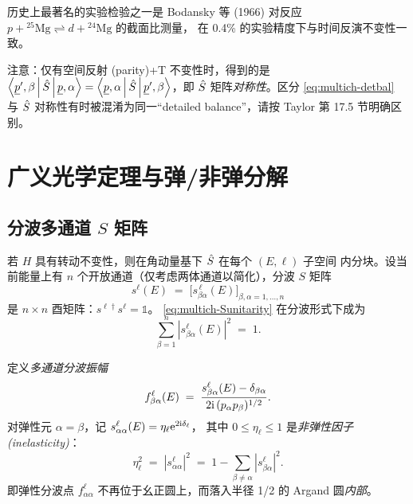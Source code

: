 历史上最著名的实验检验之一是 Bodansky 等 (1966) 对反应
$p+{}^{25}\text{Mg}\rightleftharpoons d+{}^{24}\text{Mg}$ 的截面比测量，
在 0.4\% 的实验精度下与时间反演不变性一致。

\begin{remark}\label{rmk:multich-no-detbal-pT}
  注意：仅有空间反射 (parity)+T 不变性时，得到的是
  $\left\langle \underline{p}',\beta \,\middle|\, \hat{S} \,\middle|\, \underline{p},\alpha \right\rangle=
   \left\langle \underline{p},\alpha \,\middle|\, \hat{S} \,\middle|\, \underline{p}',\beta \right\rangle$，即
  $\hat{S}$ 矩阵\emph{对称性}。区分 \eqref{eq:multich-detbal} 与
  $\hat{S}$ 对称性有时被混淆为同一“detailed balance”，请按
  Taylor 第 17.5 节明确区别。
\end{remark}

\section{广义光学定理与弹/非弹分解}
\label{sec:multich-optical}

\subsection{分波多通道 $S$ 矩阵}

若 $H$ 具有转动不变性，则在角动量基下 $\hat{S}$ 在每个 $(E,\ell)$ 子空间
内分块。设当前能量上有 $n$ 个开放通道（仅考虑两体通道以简化），分波
$S$ 矩阵
\begin{equation}
  s^\ell(E)\;=\;\bigl[s^{\,\ell}_{\beta\alpha}(E)\bigr]_{\beta,\alpha=1,\dots,n}
\end{equation}
是 $n\times n$ 酉矩阵：$s^{\ell\dagger} s^\ell = \mathbb{1}$。
\eqref{eq:multich-Sunitarity} 在分波形式下成为
\begin{equation}
  \sum_{\beta=1}^{n} |s_{\beta\alpha}^\ell(E)|^2 \;=\; 1 .
  \label{eq:multich-pwunitarity}
\end{equation}

定义\emph{多通道分波振幅}
\begin{equation}
  f_{\beta\alpha}^\ell(E)\;=\;
  \frac{s_{\beta\alpha}^\ell(E)-\delta_{\beta\alpha}}{2\mathrm{i}\,(p_\alpha p_\beta)^{1/2}} .
\end{equation}
对弹性元 $\alpha=\beta$，记 $s_{\alpha\alpha}^\ell(E)=\eta_\ell\mathrm{e}^{2\mathrm{i}\delta_\ell}$，
其中 $0\le \eta_\ell\le 1$ 是\emph{非弹性因子 (inelasticity)}：
\begin{equation}
  \eta_\ell^2 \;=\; |s_{\alpha\alpha}^\ell|^2
  \;=\;1-\sum_{\beta\ne\alpha}|s_{\beta\alpha}^\ell|^2 .
\end{equation}
即弹性分波点 $f_{\alpha\alpha}^\ell$ 不再位于幺正圆上，而落入半径 1/2 的
Argand 圆\emph{内部}。

